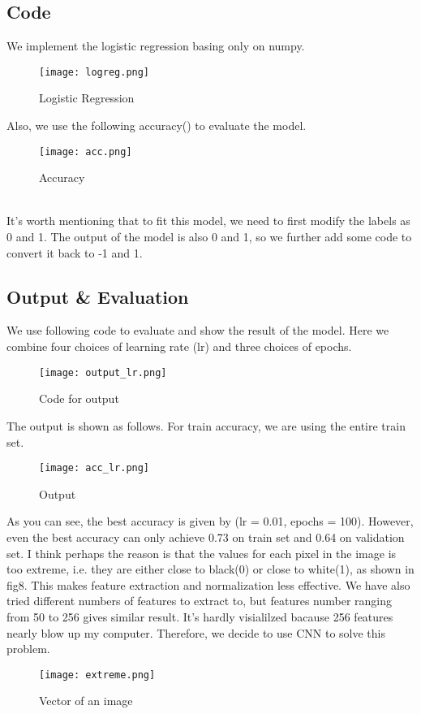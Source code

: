 \documentclass[conference]{IEEEtran}
\begin{document}
\subsection{Code}
We implement the logistic regression basing only on numpy.
\begin{figure}[ht]
    \centering
    \texttt{[image: logreg.png]}
    \caption{Logistic Regression}
    \label{fig4:Logistic Regression}
    \end{figure}
Also, we use the following accuracy() to evaluate the model.
\begin{figure}[ht]
    \centering
    \texttt{[image: acc.png]}
    \caption{Accuracy}
    \label{fig5:Accuracy}
    \end{figure}
\\It's worth mentioning that to fit this model, we need to first modify the labels as 0 and 1. The output of the model is also 0 and 1, so we further add some code to convert
it back to -1 and 1.
\subsection{Output \& Evaluation}
We use following code to evaluate and show the result of the model. Here we combine four choices of learning rate (lr) and three choices of epochs.
\begin{figure}
    \centering
    \texttt{[image: output\_lr.png]}
    \caption{Code for output}
    \label{fig6:Code for output}
    \end{figure}
The output is shown as follows. For train accuracy, we are using the entire train set.
\begin{figure}
    \centering
    \texttt{[image: acc\_lr.png]}
    \caption{Output}
    \label{fig7:Accuracy of Logistic Regression}
    \end{figure}
As you can see, the best accuracy is given by (lr = 0.01, epochs = 100). However, even the best accuracy can only achieve
0.73 on train set and 0.64 on validation set. I think perhaps the reason is that the values for each pixel in the image
is too extreme, i.e. they are either close to black(0) or close to white(1), as shown in fig8. This makes feature extraction and normalization
less effective. We have also tried different numbers of features to extract to, but features number ranging from 50 to 256 gives
similar result. It's hardly visialilzed bacause 256 features nearly blow up my computer. Therefore, we decide to use CNN to solve this problem.
\begin{figure}
    \centering
    \texttt{[image: extreme.png]}
    \caption{Vector of an image}
    \label{fig8:Vector of an image}
    \end{figure}
\end{document}
